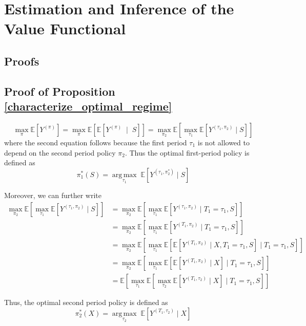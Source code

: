 \documentclass[12pt]{article}
\newcommand{\1}{\mathbf{1}}
\newcommand{\argmax}{\operatorname*{arg\,max}}
\begin{document}
\section{Estimation and Inference of the Value Functional}


\newpage



\newpage
\begin{appendix}
\section{Proofs}

\subsection{Proof of Proposition \ref{characterize_optimal_regime}}
\[
\max_\pi \mathbb{E}\left[Y^{(\pi)}\right] = \max_\pi \mathbb{E}\left[\mathbb{E}\left[Y^{(\pi)} \; \mid \; S\right]\right] = \max_{\pi_2} \mathbb{E} \left[ \max_{\tau_1}\mathbb{E}\left[Y^{(\tau_1, \pi_2)} \mid S\right]\right]
\]
where the second equation follows because the first period $\tau_1$ is not allowed to depend on the second period policy $\pi_2$. Thus the optimal first-period policy is defined as
\[
\pi^*_1(S) = \argmax_{\tau_1} \; \mathbb{E}\left[Y^{(\tau_1, \pi^*_2)} \mid S\right]
\]

Moreover, we can further write
\begin{align*}
    \max_{\pi_2} \mathbb{E}\left[\max_{\tau_1} \mathbb{E}\left[Y^{(\tau_1, \pi_2)} \mid S\right]\right] &=  \max_{\pi_2} \mathbb{E}\left[\max_{\tau_1} \mathbb{E}\left[Y^{(\tau_1, \pi_2)} \mid T_1 = \tau_1, S\right]\right]\\
    &= \max_{\pi_2} \mathbb{E}\left[\max_{\tau_1} \mathbb{E}\left[Y^{(T_1, \pi_2)} \mid T_1 = \tau_1, S\right]\right]\\
    &= \max_{\pi_2} \mathbb{E}\left[\max_{\tau_1} \mathbb{E}\left[ \mathbb{E}\left[Y^{(T_1, \pi_2)} \mid X, T_1 = \tau_1, S\right] \mid T_1 = \tau_1, S\right]\right]\\
    &= \max_{\pi_2} \mathbb{E}\left[\max_{\tau_1} \mathbb{E}\left[ \mathbb{E}\left[Y^{(T_1, \pi_2)} \mid X\right] \mid T_1 = \tau_1, S\right]\right]\\
    &= \mathbb{E}\left[\max_{\tau_1} \mathbb{E}\left[ \max_{\tau_2}\mathbb{E}\left[Y^{(T_1, \tau_2)} \mid X\right] \mid T_1 = \tau_1, S\right]\right]
\end{align*}

Thus, the optimal second period policy is defined as 
\[
\pi^*_2(X) = \argmax_{\tau_2} \; \mathbb{E}\left[Y^{(T_1, \tau_2)} \mid X\right]
\]


\end{appendix}
\end{document}
